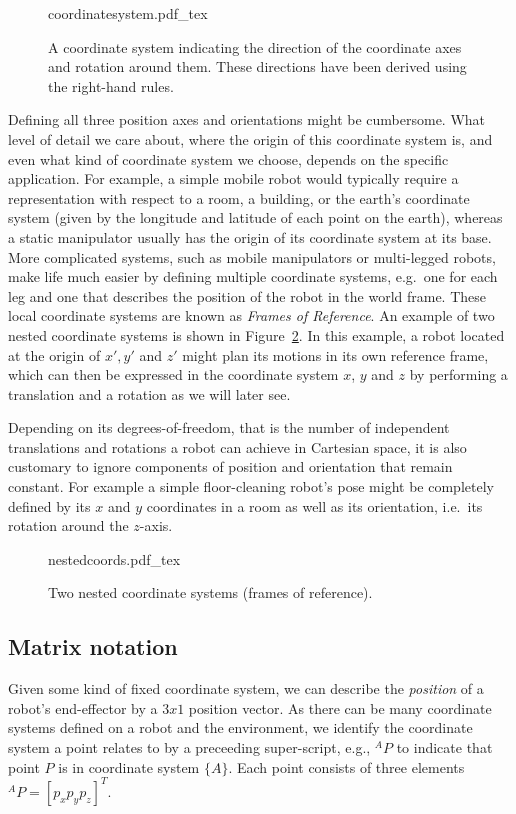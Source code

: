 \begin{figure}
    \centering
    \def\svgwidth{0.8\textwidth}
    {coordinatesystem.pdf_tex}
    \caption{A coordinate system indicating the direction of the coordinate axes and rotation around them. These directions have been derived using the right-hand rules.}
    \label{fig:coordinatesystem}
\end{figure}

Defining all three position axes and orientations might be cumbersome. What level of detail we care about, where the origin of this coordinate system is, and even what kind of coordinate system we choose, depends on the specific application. For example, a simple mobile robot would typically require a representation with respect to a room, a building, or the earth's coordinate system (given by the longitude and latitude of each point on the earth), whereas a static manipulator usually has the origin of its coordinate system at its base. More complicated systems, such as mobile manipulators or multi-legged robots, make life much easier by defining multiple coordinate systems, e.g.\ one for each leg and one that describes the position of the robot in the world frame. These local coordinate systems are known as \emph{Frames of Reference}.
An example of two nested coordinate systems is shown in Figure~\ref{fig:nestedcoords}. In this example, a robot located at the origin of $x',y'$ and $z'$ might plan its motions in its own reference frame, which can then be expressed in the coordinate system $x$, $y$ and $z$ by performing a translation and a rotation as we will later see.

Depending on its degrees-of-freedom, that is the number of independent translations and rotations a robot can achieve in Cartesian space, it is also customary to ignore components of position and orientation that remain constant. For example a simple floor-cleaning robot's pose might be completely defined by its $x$ and $y$ coordinates in a room as well as its orientation, i.e.\ its rotation around the $z$-axis.

\begin{figure}
    \centering
    \def\svgwidth{\textwidth}
    {nestedcoords.pdf_tex}
    \caption{Two nested coordinate systems (frames of reference).}
    \label{fig:nestedcoords}
\end{figure}

\subsection{Matrix notation}
Given some kind of fixed coordinate system, we can describe the \emph{position} of a robot's end-effector by a $3x1$ position vector. As there can be many coordinate systems defined on a robot and the environment, we identify the coordinate system a point relates to by a preceeding super-script, e.g., $ ^AP$ to indicate that point $P$ is in coordinate system $\{A\}$. Each point consists of three elements $ ^AP=[p_x p_y p_z]^T$.

